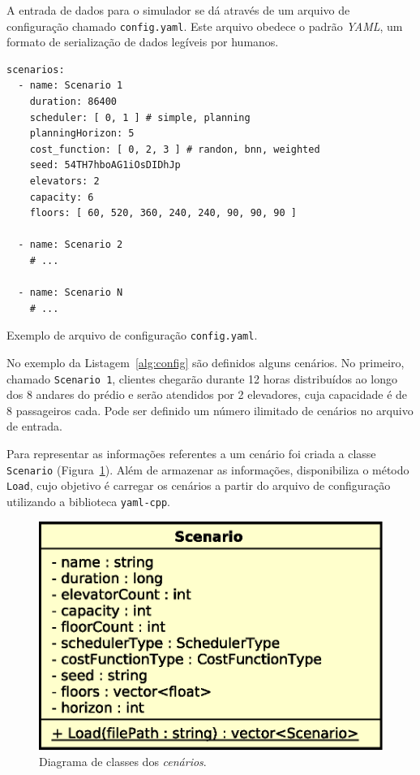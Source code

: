 A entrada de dados para o simulador se dá através de um arquivo de configuração
chamado \texttt{config.yaml}. Este arquivo obedece o padrão \textit{YAML}, um
formato de serialização de dados legíveis por humanos.

\begin{listing}[htb!]
  \centering
    \begin{verbatim}
scenarios:
  - name: Scenario 1
    duration: 86400
    scheduler: [ 0, 1 ] # simple, planning
    planningHorizon: 5
    cost_function: [ 0, 2, 3 ] # randon, bnn, weighted
    seed: 54TH7hboAG1iOsDIDhJp
    elevators: 2
    capacity: 6
    floors: [ 60, 520, 360, 240, 240, 90, 90, 90 ]

  - name: Scenario 2
    # ...

  - name: Scenario N
    # ...
    \end{verbatim}
  \caption{Exemplo de arquivo de configuração \texttt{config.yaml}.}
  \label{alg:config}
\end{listing}

No exemplo da Listagem~\ref{alg:config} são definidos alguns cenários. No
primeiro, chamado \texttt{Scenario 1}, clientes chegarão durante 12 horas
distribuídos ao longo dos 8 andares do prédio e serão atendidos por 2
elevadores, cuja capacidade é de 8 passageiros cada. Pode ser definido um número
ilimitado de cenários no arquivo de entrada.

Para representar as informações referentes a um cenário foi criada a classe
\texttt{Scenario} (Figura~\ref{fig:diagram:scenario}). Além de armazenar as
informações, disponibiliza o método \texttt{Load}, cujo objetivo é carregar os
cenários a partir do arquivo de configuração utilizando a biblioteca \texttt
{yaml-cpp}.

\begin{figure}[htb!]
  \centering
  \includegraphics[scale=0.6]{img/Scenario}
  \caption{Diagrama de classes dos \textit{cenários}.}
\label{fig:diagram:scenario}
\end{figure}

